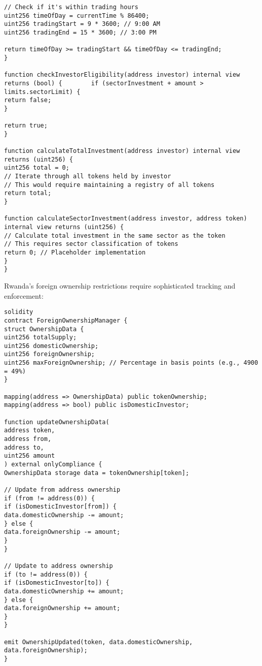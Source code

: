 \documentclass[12pt]{article}
\begin{document}
{{{\begin{lstlisting}
// Check if it's within trading hours
uint256 timeOfDay = currentTime % 86400;
uint256 tradingStart = 9 * 3600; // 9:00 AM
uint256 tradingEnd = 15 * 3600; // 3:00 PM

return timeOfDay >= tradingStart && timeOfDay <= tradingEnd;
}

function checkInvestorEligibility(address investor) internal view returns (bool) {        if (sectorInvestment + amount > limits.sectorLimit) {
return false;
}

return true;
}

function calculateTotalInvestment(address investor) internal view returns (uint256) {
uint256 total = 0;
// Iterate through all tokens held by investor
// This would require maintaining a registry of all tokens
return total;
}

function calculateSectorInvestment(address investor, address token) internal view returns (uint256) {
// Calculate total investment in the same sector as the token
// This requires sector classification of tokens
return 0; // Placeholder implementation
}
}
\end{lstlisting}


Rwanda's foreign ownership restrictions require sophisticated tracking and enforcement:


\begin{lstlisting}
solidity
contract ForeignOwnershipManager {
struct OwnershipData {
uint256 totalSupply;
uint256 domesticOwnership;
uint256 foreignOwnership;
uint256 maxForeignOwnership; // Percentage in basis points (e.g., 4900 = 49%)
}

mapping(address => OwnershipData) public tokenOwnership;
mapping(address => bool) public isDomesticInvestor;

function updateOwnershipData(
address token,
address from,
address to,
uint256 amount
) external onlyCompliance {
OwnershipData storage data = tokenOwnership[token];

// Update from address ownership
if (from != address(0)) {
if (isDomesticInvestor[from]) {
data.domesticOwnership -= amount;
} else {
data.foreignOwnership -= amount;
}
}

// Update to address ownership
if (to != address(0)) {
if (isDomesticInvestor[to]) {
data.domesticOwnership += amount;
} else {
data.foreignOwnership += amount;
}
}

emit OwnershipUpdated(token, data.domesticOwnership, data.foreignOwnership);
}


\end{lstlisting}}}}
\end{document}
